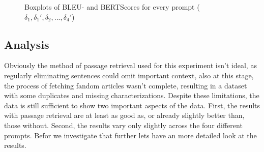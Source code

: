 \begin{figure}[H]
\begin{subfigure}[b]{\textwidth}

        \label{fig:boxplot}
    \end{subfigure}
    \vspace{1cm}
    \caption{Boxplots of BLEU- and BERTScores for every prompt ($\delta_{1}, \delta_{1}', \delta_{2},...,\delta_{4}'$)}
\end{figure}



\subsection{Analysis}
Obviously the method of passage retrieval used for this experiment isn't ideal, as regularly eliminating sentences could omit important context, also at this stage, the process of fetching fandom articles wasn't complete, resulting in a dataset with some duplicates and missing characterizations. Despite these limitations, the data is still sufficient to show two important aspects of the data. First, the results with passage retrieval are at least as good as, or already slightly better than, those without. Second, the results vary only slightly across the four different prompts. Befor we investigate that further lets have an more detailed look at the results.\\

